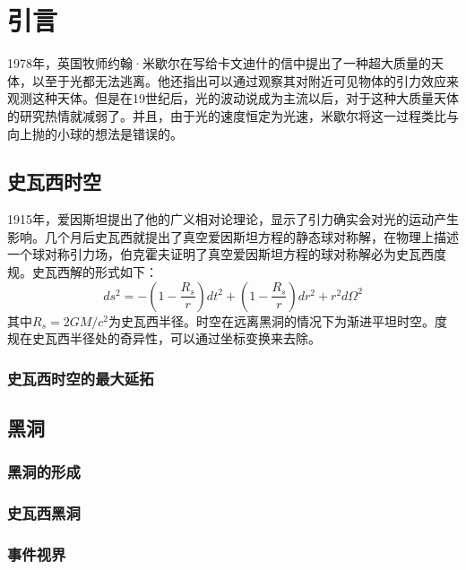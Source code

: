\chapter{引言}
1978年，英国牧师约翰·米歇尔在写给卡文迪什的信中提出了一种超大质量的天体，以至于光都无法逃离\citep{michell1784vii}。他还指出可以通过观察其对附近可见物体的引力效应来观测这种天体。但是在19世纪后，光的波动说成为主流以后，对于这种大质量天体的研究热情就减弱了。并且，由于光的速度恒定为光速，米歇尔将这一过程类比与向上抛的小球的想法是错误的。
\section{史瓦西时空}
1915年，爱因斯坦提出了他的广义相对论理论，显示了引力确实会对光的运动产生影响。几个月后史瓦西就提出了真空爱因斯坦方程的静态球对称解\citep{schwarzschild1916gravitationsfeld}，在物理上描述一个球对称引力场，伯克霍夫证明了真空爱因斯坦方程的球对称解必为史瓦西度规\citep{birkhoff1923relativity}。史瓦西解的形式如下：
\begin{equation}
    ds^2=-\left(1-\frac{R_s}{r}\right)dt^2+\left(1-\frac{R_s}{r}\right)dr^2+r^2d\Omega^2
\end{equation}
其中$R_s=2GM/c^2$为史瓦西半径。时空在远离黑洞的情况下为渐进平坦时空。度规在史瓦西半径处的奇异性，可以通过坐标变换来去除。
\subsection{史瓦西时空的最大延拓}
\section{黑洞}
\subsection{黑洞的形成}
\subsection{史瓦西黑洞}

\subsection{事件视界}

